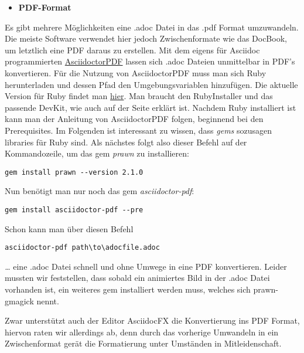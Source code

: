 \documentclass[11pt]{amsbook}
\begin{document}
\begin{itemize}

\item \textbf{PDF-Format}

\end{itemize}


Es gibt mehrere Möglichkeiten eine .adoc Datei in das .pdf Format umzuwandeln. Die meiste Software verwendet hier jedoch Zwischenformate wie das DocBook, um letztlich eine PDF daraus zu erstellen. Mit dem eigens für Asciidoc programmierten \href{https://github.com/asciidoctor/asciidoctor-pdf}{AsciidoctorPDF} lassen sich .adoc Dateien unmittelbar in PDF’s konvertieren. Für die Nutzung von AsciidoctorPDF muss man sich Ruby herunterladen und dessen Pfad den Umgebungsvariablen hinzufügen. Die aktuelle Version für Ruby findet man \href{http://rubyinstaller.org/downloads/}{hier}. Man braucht den RubyInstaller und das passende DevKit, wie auch auf der Seite erklärt ist. Nachdem Ruby installiert ist kann man der Anleitung von AsciidoctorPDF folgen, beginnend bei den Prerequisites. Im Folgenden ist interessant zu wissen, dass \emph{gems} sozusagen libraries für Ruby sind. Als nächstes folgt also dieser Befehl auf der Kommandozeile, um das gem \emph{prawn} zu installieren:


\begin{verbatim}
gem install prawn --version 2.1.0
\end{verbatim}

Nun benötigt man nur noch das gem \emph{asciidoctor-pdf}:


\begin{verbatim}
gem install asciidoctor-pdf --pre
\end{verbatim}

Schon kann man über diesen Befehl


\begin{verbatim}
asciidoctor-pdf path\to\adocfile.adoc
\end{verbatim}

\emph{…​} eine .adoc Datei schnell und ohne Umwege in eine PDF konvertieren.
Leider mussten wir feststellen, dass sobald ein animiertes Bild in der .adoc Datei vorhanden ist, ein weiteres gem installiert werden muss, welches sich prawn-gmagick nennt.


Zwar unterstützt auch der Editor AsciidocFX die Konvertierung ins PDF Format, hiervon raten wir allerdings ab, denn durch das vorherige Umwandeln in ein Zwischenformat gerät die Formatierung unter Umständen in Mitleidenschaft.
\end{document}
